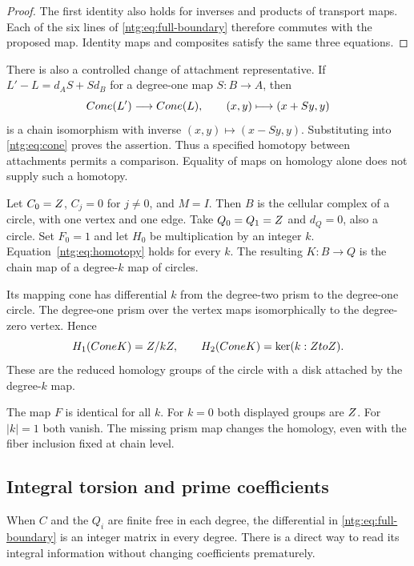\begin{proof}
The first identity also holds for inverses and products of transport
maps. Each of the six lines of \eqref{ntg:eq:full-boundary} therefore
commutes with the proposed map. Identity maps and composites satisfy
the same three equations.
\end{proof}

There is also a controlled change of attachment representative. If
$L'-L=d_AS+Sd_B$ for a degree-one map $S:B\to A$, then
\[
 Cone(L')\longrightarrow Cone(L),\qquad (x,y)\longmapsto(x+Sy,y)
\]
is a chain isomorphism with inverse $(x,y)\mapsto(x-Sy,y)$.
Substituting into \eqref{ntg:eq:cone} proves the assertion. Thus a
specified homotopy between attachments permits a comparison. Equality
of maps on homology alone does not supply such a homotopy.

\begin{example}\label{ntg:ex:missing-H}
Let $C_0=Z$, $C_j=0$ for $j\ne0$, and $M=I$. Then $B$ is the
cellular complex of a circle, with one vertex and one edge.
Take $Q_0=Q_1=Z$ and $d_Q=0$, also a circle. Set $F_0=1$ and
let $H_0$ be multiplication by an integer $k$.
Equation~\eqref{ntg:eq:homotopy} holds for every $k$. The resulting
$K:B\to Q$ is the chain map of a degree-$k$ map of circles.

Its mapping cone has differential $k$ from the degree-two prism to
the degree-one circle. The degree-one prism over the vertex maps
isomorphically to the degree-zero vertex. Hence
\[
 H_1(Cone K)=Z/kZ,\qquad
 H_2(Cone K)=\ker(k:ZtoZ).
\]
These are the reduced homology groups of the circle with a disk
attached by the degree-$k$ map.

The map $F$ is identical for all $k$.
For $k=0$ both displayed groups are $Z$. For $|k|=1$ both vanish.
The missing prism map changes the homology, even with the fiber
inclusion fixed at chain level.
\end{example}

\subsection{Integral torsion and prime coefficients}\label{ntg:sec:torsion}

When $C$ and the $Q_i$ are finite free in each degree, the differential
in \eqref{ntg:eq:full-boundary} is an integer matrix in every degree.
There is a direct way to read its integral information without changing
coefficients prematurely.

